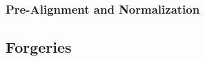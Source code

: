\documentclass[a4paper, oneside]{csthesis}
\begin{document}
\subsubsection{Pre-Alignment and Normalization}



\subsection{Forgeries}

\end{document}
